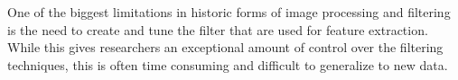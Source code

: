 One of the biggest limitations in historic forms of image processing and filtering is the need to create and tune the filter that are used for feature extraction. While this gives researchers an exceptional amount of control over the filtering techniques, this is often time consuming and difficult to generalize to new data.





